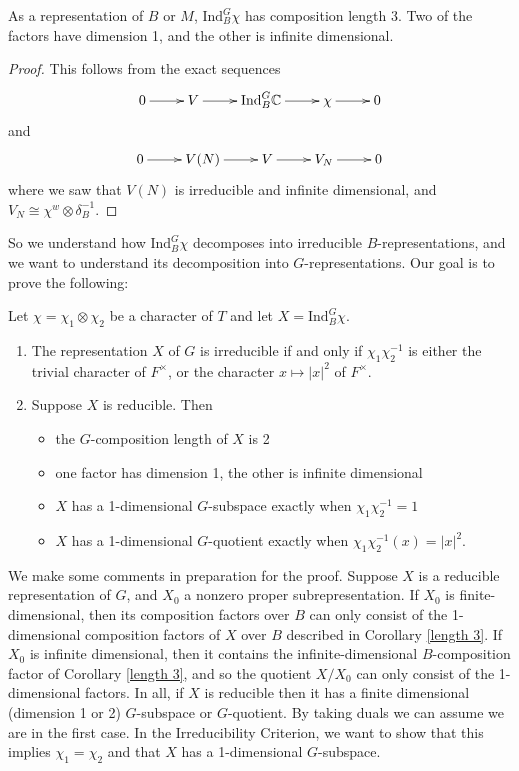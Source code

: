 \begin{cor}\label{length 3}
    As a representation of $B$ or $M$, $\mathrm{Ind}_B^G \chi$ has composition length 3. Two of the factors have dimension 1, and the other is infinite dimensional.
\end{cor}
\begin{proof}
    This follows from the exact sequences
    $$\xymatrix{0 \ar[r] & V \ar[r] & \mathrm{Ind}_B^G \CC \ar[r] & \chi \ar[r] & 0}$$
    and
    $$\xymatrix{0 \ar[r] & V(N) \ar[r] & V \ar[r] & V_N \ar[r] & 0}$$
    where we saw that $V(N)$ is irreducible and infinite dimensional, and $V_N \cong \chi^w \otimes \delta_B^{-1}$.
\end{proof}

So we understand how $\mathrm{Ind}_B^G \chi$ decomposes into irreducible $B$-representations, and we want to understand its decomposition into $G$-representations. Our goal is to prove the following:

\begin{thm}\label{criterion}
    Let $\chi = \chi_1 \otimes \chi_2$ be a character of $T$ and let $X = \mathrm{Ind}_B^G \chi$.
    \begin{enumerate}
        \item The representation $X$ of $G$ is irreducible if and only if $\chi_1\chi_2^{-1}$ is either the trivial character of $F^\times$, or the character $x \mapsto |x|^2$ of $F^\times$.
        \item Suppose $X$ is reducible. Then \begin{itemize}
            \item the $G$-composition length of $X$ is 2
            \item one factor has dimension 1, the other is infinite dimensional
            \item $X$ has a 1-dimensional $G$-subspace exactly when $\chi_1\chi_2^{-1}=1$
            \item $X$ has a 1-dimensional $G$-quotient exactly when $\chi_1\chi_2^{-1}(x) = |x|^2$.
        \end{itemize}
    \end{enumerate}
\end{thm}

We make some comments in preparation for the proof. Suppose $X$ is a reducible representation of $G$, and $X_0$ a nonzero proper subrepresentation. If $X_0$ is finite-dimensional, then its composition factors over $B$ can only consist of the 1-dimensional composition factors of $X$ over $B$ described in Corollary \ref{length 3}. If $X_0$ is infinite dimensional, then it contains the infinite-dimensional $B$-composition factor of Corollary \ref{length 3}, and so the quotient $X/X_0$ can only consist of the 1-dimensional factors. In all, if $X$ is reducible then it has a finite dimensional (dimension 1 or 2) $G$-subspace or $G$-quotient. By taking duals we can assume we are in the first case. In the Irreducibility Criterion, we want to show that this implies $\chi_1 = \chi_2$ and that $X$ has a 1-dimensional $G$-subspace.

